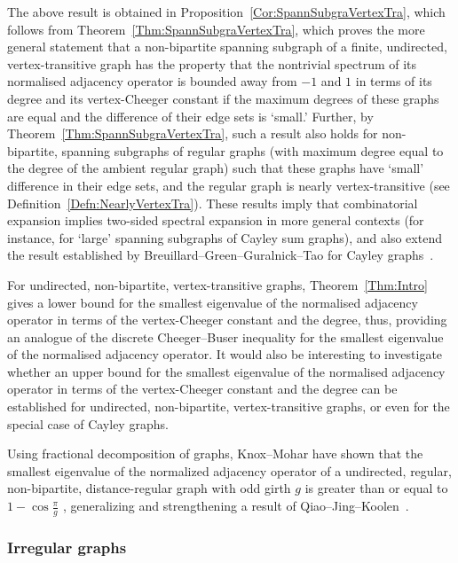 \documentclass[10pt]{article}
\theoremstyle{definition}
\begin{document}
The above result is obtained in Proposition~\ref{Cor:SpannSubgraVertexTra}, which follows from Theorem~\ref{Thm:SpannSubgraVertexTra}, which proves the more general statement that a non-bipartite spanning subgraph of a finite, undirected, vertex-transitive graph has the property that the nontrivial spectrum of its normalised adjacency operator is bounded away from $-1$ and $1$ in terms of its degree and its vertex-Cheeger constant if the maximum degrees of these graphs are equal and the difference of their edge sets is `small.' Further, by Theorem~\ref{Thm:SpannSubgraVertexTra}, such a result also holds for non-bipartite, spanning subgraphs of regular graphs (with maximum degree equal to the degree of the ambient regular graph) such that these graphs have `small' difference in their edge sets, and the regular graph is nearly vertex-transitive (see Definition~\ref{Defn:NearlyVertexTra}). These results imply that combinatorial expansion implies two-sided spectral expansion in more general contexts (for instance, for `large' spanning subgraphs of Cayley sum graphs), and also extend the result  established by Breuillard--Green--Guralnick--Tao for Cayley graphs~\cite[Appendix E]{BGGTExpansionSimpleLie}. 

For undirected, non-bipartite, vertex-transitive graphs, Theorem~\ref{Thm:Intro} gives a lower bound for the smallest eigenvalue of the normalised adjacency operator in terms of the vertex-Cheeger constant and the degree, thus, providing an analogue of the discrete Cheeger--Buser inequality for the smallest eigenvalue of the normalised adjacency operator. It would also be interesting to investigate whether an upper bound for the smallest eigenvalue of the normalised adjacency operator in terms of the vertex-Cheeger constant and the degree can be established for undirected, non-bipartite, vertex-transitive graphs, or even for the special case of Cayley graphs. 

Using fractional decomposition of graphs, Knox--Mohar have shown that the smallest eigenvalue of the normalized adjacency operator of a undirected, regular, non-bipartite, distance-regular graph with odd girth $g$ is greater than or equal to $1 - \cos \frac \pi g$ 
\cite[Corollary 5]{KnoxMoharFractionalDecomSmallestEigenVal}, generalizing and strengthening a result of Qiao--Jing--Koolen~\cite[Theorem 1]{QiaoJingKoolenNonBipartiteDistRegular}.


\subsubsection{Irregular graphs}
\label{Subsubsec:IrregularGraphs}
\end{document}

